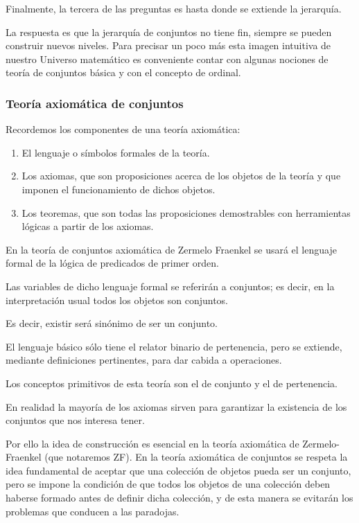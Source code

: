 Finalmente, la tercera de las preguntas es hasta donde se extiende
la jerarquía. 

La respuesta es que la jerarquía de conjuntos no tiene fin, siempre
se pueden construir nuevos niveles. Para precisar un poco más esta
imagen intuitiva de nuestro Universo matemático es conveniente contar
con algunas nociones de teoría de conjuntos básica y con el concepto
de ordinal. 

\subsubsection{Teoría axiomática de conjuntos }

Recordemos los componentes de una teoría axiomática: 
\begin{enumerate}
\item El lenguaje o símbolos formales de la teoría. 
\item Los axiomas, que son proposiciones acerca de los objetos de la teoría
y que imponen el funcionamiento de dichos objetos. 
\item Los teoremas, que son todas las proposiciones demostrables con herramientas
lógicas a partir de los axiomas. 
\end{enumerate}
En la teoría de conjuntos axiomática de Zermelo Fraenkel se usará
el lenguaje formal de la lógica de predicados de primer orden. 

Las variables de dicho lenguaje formal se referirán a conjuntos; es
decir, en la interpretación usual todos los objetos son conjuntos.

Es decir, existir será sinónimo de ser un conjunto.

El lenguaje básico sólo tiene el relator binario de pertenencia, pero
se extiende, mediante definiciones pertinentes, para dar cabida a
operaciones. 

Los conceptos primitivos de esta teoría son el de conjunto y el de
pertenencia. 

En realidad la mayoría de los axiomas sirven para garantizar la existencia
de los conjuntos que nos interesa tener. 

Por ello la idea de construcción es esencial en la teoría axiomática
de Zermelo-Fraenkel (que notaremos ZF). En la teoría axiomática de
conjuntos se respeta la idea fundamental de aceptar que una colección
de objetos pueda ser un conjunto, pero se impone la condición de que
todos los objetos de una colección deben haberse formado antes de
definir dicha colección, y de esta manera se evitarán los problemas
que conducen a las paradojas.

